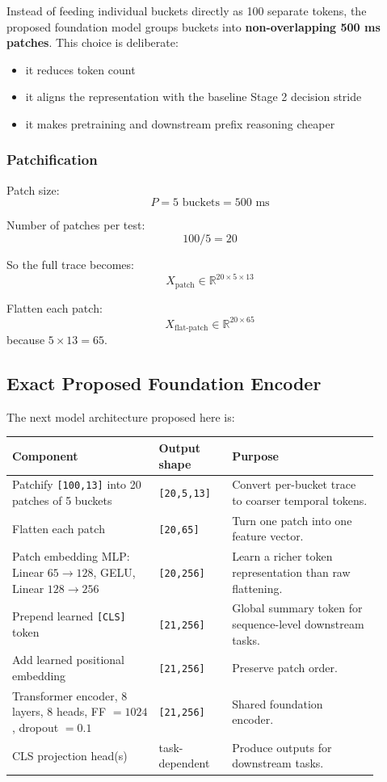 \documentclass[11pt]{article}
\newcommand{\toprule}{\hline}
\newcommand{\midrule}{\hline}
\newcommand{\bottomrule}{\hline}
\begin{document}
Instead of feeding individual buckets directly as 100 separate tokens, the proposed foundation model groups buckets into \textbf{non-overlapping 500 ms patches}. This choice is deliberate:
\begin{itemize}
\item it reduces token count
\item it aligns the representation with the baseline Stage 2 decision stride
\item it makes pretraining and downstream prefix reasoning cheaper
\end{itemize}

\subsubsection*{Patchification}

Patch size:
\[
P = 5 \text{ buckets} = 500 \text{ ms}
\]

Number of patches per test:
\[
100 / 5 = 20
\]

So the full trace becomes:
\[
X_{\text{patch}} \in \mathbb{R}^{20 \times 5 \times 13}
\]

Flatten each patch:
\[
X_{\text{flat-patch}} \in \mathbb{R}^{20 \times 65}
\]
because \(5 \times 13 = 65\).

\subsection{Exact Proposed Foundation Encoder}

The next model architecture proposed here is:

\begin{center}
\begin{tabular}{p{0.36\linewidth} p{0.18\linewidth} p{0.36\linewidth}}
\toprule
\textbf{Component} & \textbf{Output shape} & \textbf{Purpose} \\
\midrule
Patchify \texttt{[100,13]} into 20 patches of 5 buckets & \texttt{[20,5,13]} & Convert per-bucket trace to coarser temporal tokens. \\
Flatten each patch & \texttt{[20,65]} & Turn one patch into one feature vector. \\
Patch embedding MLP: Linear \(65 \rightarrow 128\), GELU, Linear \(128 \rightarrow 256\) & \texttt{[20,256]} & Learn a richer token representation than raw flattening. \\
Prepend learned \texttt{[CLS]} token & \texttt{[21,256]} & Global summary token for sequence-level downstream tasks. \\
Add learned positional embedding & \texttt{[21,256]} & Preserve patch order. \\
Transformer encoder, 8 layers, 8 heads, FF \(= 1024\), dropout \(= 0.1\) & \texttt{[21,256]} & Shared foundation encoder. \\
CLS projection head(s) & task-dependent & Produce outputs for downstream tasks. \\
\bottomrule
\end{tabular}
\end{center}
\end{document}
